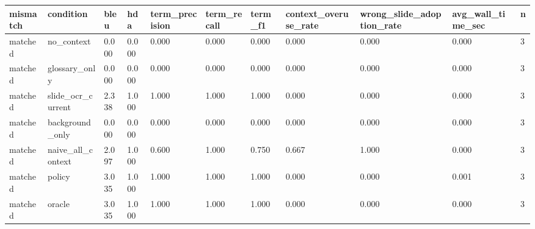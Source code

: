 \begin{tabular}{lllllllllll}
\toprule
mismatch & condition & bleu & hda & term\_precision & term\_recall & term\_f1 & context\_overuse\_rate & wrong\_slide\_adoption\_rate & avg\_wall\_time\_sec & n \\
\midrule
matched & no\_context & 0.000 & 0.000 & 0.000 & 0.000 & 0.000 & 0.000 & 0.000 & 0.000 & 3 \\
matched & glossary\_only & 0.000 & 0.000 & 0.000 & 0.000 & 0.000 & 0.000 & 0.000 & 0.000 & 3 \\
matched & slide\_ocr\_current & 2.338 & 1.000 & 1.000 & 1.000 & 1.000 & 0.000 & 0.000 & 0.000 & 3 \\
matched & background\_only & 0.000 & 0.000 & 0.000 & 0.000 & 0.000 & 0.000 & 0.000 & 0.000 & 3 \\
matched & naive\_all\_context & 2.097 & 1.000 & 0.600 & 1.000 & 0.750 & 0.667 & 1.000 & 0.000 & 3 \\
matched & policy & 3.035 & 1.000 & 1.000 & 1.000 & 1.000 & 0.000 & 0.000 & 0.001 & 3 \\
matched & oracle & 3.035 & 1.000 & 1.000 & 1.000 & 1.000 & 0.000 & 0.000 & 0.000 & 3 \\
\bottomrule
\end{tabular}
